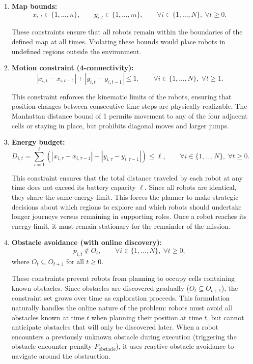 \begin{enumerate}
    \item \textbf{Map bounds:}
    \[
        x_{i,t} \in \{1,\ldots,n\}, \qquad y_{i,t} \in \{1,\ldots,m\}, \qquad \forall i \in \{1,\ldots,N\},\; \forall t \ge 0.
    \]
    
    These constraints ensure that all robots remain within the boundaries of the defined map at all times. Violating these bounds would place robots in undefined regions outside the environment.
    
    \item \textbf{Motion constraint (4-connectivity):}
    \[
        |x_{i,t}-x_{i,t-1}| + |y_{i,t}-y_{i,t-1}| \le 1, \qquad \forall i \in \{1,\ldots,N\},\; \forall t \ge 1.
    \]
    
    This constraint enforces the kinematic limits of the robots, ensuring that position changes between consecutive time steps are physically realizable. The Manhattan distance bound of 1 permits movement to any of the four adjacent cells or staying in place, but prohibits diagonal moves and larger jumps.
    
    \item \textbf{Energy budget:}
    \[
        D_{i,t} = \sum_{\tau=1}^{t} \left(|x_{i,\tau}-x_{i,\tau-1}| + |y_{i,\tau}-y_{i,\tau-1}|\right) \le \ell, \qquad \forall i \in \{1,\ldots,N\},\; \forall t \ge 0.
    \]
    
    This constraint ensures that the total distance traveled by each robot at any time does not exceed its battery capacity $\ell$. Since all robots are identical, they share the same energy limit. This forces the planner to make strategic decisions about which regions to explore and which robots should undertake longer journeys versus remaining in supporting roles. Once a robot reaches its energy limit, it must remain stationary for the remainder of the mission.
    
    \item \textbf{Obstacle avoidance (with online discovery):}
    \[
        p_{i,t} \notin O_t, \qquad \forall i \in \{1,\ldots,N\},\; \forall t \ge 0,
    \]
    where $O_t \subseteq O_{t+1}$ for all $t \ge 0$.
    
    These constraints prevent robots from planning to occupy cells containing known obstacles. Since obstacles are discovered gradually ($O_t \subseteq O_{t+1}$), the constraint set grows over time as exploration proceeds. This formulation naturally handles the online nature of the problem: robots must avoid all obstacles known at time $t$ when planning their position at time $t$, but cannot anticipate obstacles that will only be discovered later. When a robot encounters a previously unknown obstacle during execution (triggering the obstacle encounter penalty $P_{\text{obstacle}}$), it uses reactive obstacle avoidance to navigate around the obstruction.
    

\end{enumerate}
